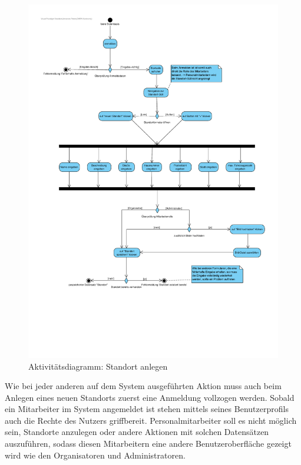 \begin{figure}[!ht]
    \centering
    \includegraphics[width=\textwidth, height=\textheight-3cm, trim = 0cm 6cm 0cm 0cm]{Bilder/Diagramme/AD_Standort_anlegen.pdf}
    \caption{Aktivitätsdiagramm: Standort anlegen}
    \label{img:ad_standort}
\end{figure}

\newpage

Wie bei jeder anderen auf dem System ausgeführten Aktion muss auch beim Anlegen eines neuen Standorts zuerst eine Anmeldung vollzogen werden. Sobald ein Mitarbeiter im System angemeldet ist stehen mittels seines Benutzerprofils auch die Rechte des Nutzers griffbereit. Personalmitarbeiter soll es nicht möglich sein, Standorte anzulegen oder andere Aktionen mit solchen Datensätzen auszuführen, sodass diesen Mitarbeitern eine andere Benutzeroberfläche gezeigt wird wie den Organisatoren und Administratoren. 


